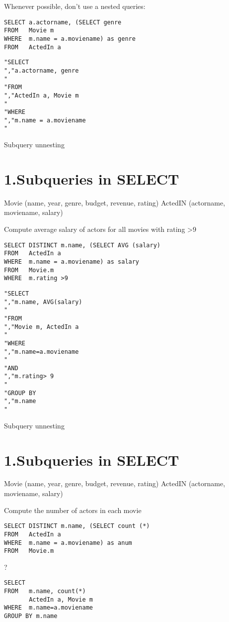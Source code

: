 \documentclass{article}
\begin{document}
Whenever possible, don't use a nested queries:

\begin{verbatim}
SELECT a.actorname, (SELECT genre
FROM   Movie m
WHERE  m.name = a.moviename) as genre
FROM   ActedIn a
\end{verbatim}

\begin{verbatim}
"SELECT
","a.actorname, genre
"
"FROM
","ActedIn a, Movie m
"
"WHERE
","m.name = a.moviename
"
\end{verbatim}

Subquery unnesting

\section*{1.Subqueries in SELECT}

Movie (name, year, genre, budget, revenue, rating) ActedIN (actorname, moviename, salary)

Compute average salary of actors for all movies with rating >9

\begin{verbatim}
SELECT DISTINCT m.name, (SELECT AVG (salary)
FROM   ActedIn a
WHERE  m.name = a.moviename) as salary
FROM   Movie.m
WHERE  m.rating >9
\end{verbatim}

\begin{verbatim}
"SELECT
","m.name, AVG(salary)
"
"FROM
","Movie m, ActedIn a
"
"WHERE
","m.name=a.moviename
"
"AND
","m.rating> 9
"
"GROUP BY
","m.name
"
\end{verbatim}

Subquery unnesting

\section*{1.Subqueries in SELECT}

Movie (name, year, genre, budget, revenue, rating) ActedIN (actorname, moviename, salary)

Compute the number of actors in each movie

\begin{verbatim}
SELECT DISTINCT m.name, (SELECT count (*)
FROM   ActedIn a
WHERE  m.name = a.moviename) as anum
FROM   Movie.m
\end{verbatim}

?

\begin{verbatim}
SELECT
FROM   m.name, count(*)
       ActedIn a, Movie m
WHERE  m.name=a.moviename
GROUP BY m.name
\end{verbatim}
\end{document}
